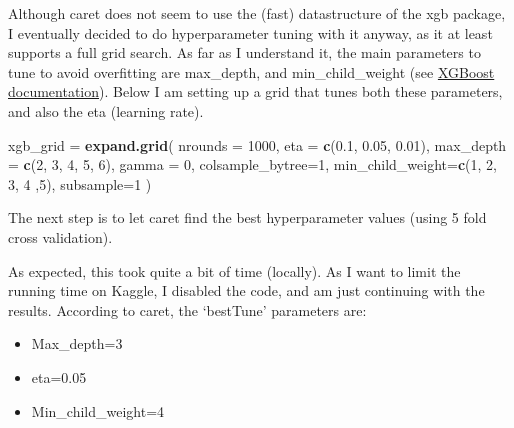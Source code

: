\documentclass[]{article}
\newenvironment{Shaded}{\begin{snugshade}}{\end{snugshade}}
\newcommand{\CommentTok}[1]{\textcolor[rgb]{0.56,0.35,0.01}{\textit{#1}}}
\newcommand{\DataTypeTok}[1]{\textcolor[rgb]{0.13,0.29,0.53}{#1}}
\newcommand{\DecValTok}[1]{\textcolor[rgb]{0.00,0.00,0.81}{#1}}
\newcommand{\FloatTok}[1]{\textcolor[rgb]{0.00,0.00,0.81}{#1}}
\newcommand{\KeywordTok}[1]{\textcolor[rgb]{0.13,0.29,0.53}{\textbf{#1}}}
\newcommand{\NormalTok}[1]{#1}
\newcommand{\StringTok}[1]{\textcolor[rgb]{0.31,0.60,0.02}{#1}}
\providecommand{\tightlist}{%
  \setlength{\itemsep}{0pt}\setlength{\parskip}{0pt}}
\begin{document}
Although caret does not seem to use the (fast) datastructure of the xgb
package, I eventually decided to do hyperparameter tuning with it
anyway, as it at least supports a full grid search. As far as I
understand it, the main parameters to tune to avoid overfitting are
max\_depth, and min\_child\_weight (see
\href{http://xgboost.readthedocs.io/en/latest/how_to/param_tuning.html}{XGBoost
documentation}). Below I am setting up a grid that tunes both these
parameters, and also the eta (learning rate).

\begin{Shaded}
\begin{Highlighting}[]
\NormalTok{xgb_grid =}\StringTok{ }\KeywordTok{expand.grid}\NormalTok{(}
\DataTypeTok{nrounds =} \DecValTok{1000}\NormalTok{,}
\DataTypeTok{eta =} \KeywordTok{c}\NormalTok{(}\FloatTok{0.1}\NormalTok{, }\FloatTok{0.05}\NormalTok{, }\FloatTok{0.01}\NormalTok{),}
\DataTypeTok{max_depth =} \KeywordTok{c}\NormalTok{(}\DecValTok{2}\NormalTok{, }\DecValTok{3}\NormalTok{, }\DecValTok{4}\NormalTok{, }\DecValTok{5}\NormalTok{, }\DecValTok{6}\NormalTok{),}
\DataTypeTok{gamma =} \DecValTok{0}\NormalTok{,}
\DataTypeTok{colsample_bytree=}\DecValTok{1}\NormalTok{,}
\DataTypeTok{min_child_weight=}\KeywordTok{c}\NormalTok{(}\DecValTok{1}\NormalTok{, }\DecValTok{2}\NormalTok{, }\DecValTok{3}\NormalTok{, }\DecValTok{4}\NormalTok{ ,}\DecValTok{5}\NormalTok{),}
\DataTypeTok{subsample=}\DecValTok{1}
\NormalTok{)}
\end{Highlighting}
\end{Shaded}

The next step is to let caret find the best hyperparameter values (using
5 fold cross validation).

\begin{Shaded}
\end{Shaded}

As expected, this took quite a bit of time (locally). As I want to limit
the running time on Kaggle, I disabled the code, and am just continuing
with the results. According to caret, the `bestTune' parameters are:

\begin{itemize}
\tightlist
\item
  Max\_depth=3
\item
  eta=0.05
\item
  Min\_child\_weight=4
\end{itemize}
\end{document}
